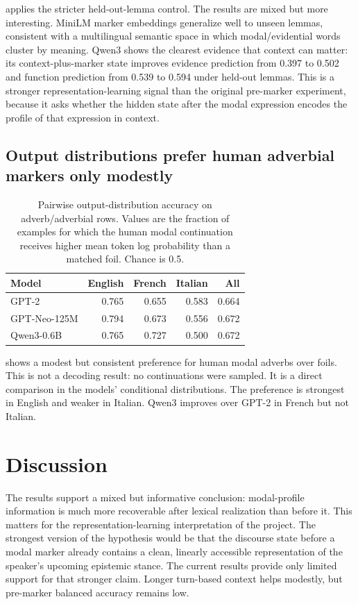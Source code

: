 \documentclass{article}
\begin{document}
 applies the stricter held-out-lemma control. The results are mixed but more interesting. MiniLM marker embeddings generalize well to unseen lemmas, consistent with a multilingual semantic space in which modal/evidential words cluster by meaning. Qwen3 shows the clearest evidence that context can matter: its context-plus-marker state improves evidence prediction from 0.397 to 0.502 and function prediction from 0.539 to 0.594 under held-out lemmas. This is a stronger representation-learning signal than the original pre-marker experiment, because it asks whether the hidden state after the modal expression encodes the profile of that expression in context.

\subsection{Output distributions prefer human adverbial markers only modestly}

\begin{table}[t]
\centering
\small
\begin{tabular}{lrrrr}
\toprule
Model & English & French & Italian & All \\
\midrule
GPT-2 & 0.765 & 0.655 & 0.583 & 0.664 \\
GPT-Neo-125M & 0.794 & 0.673 & 0.556 & 0.672 \\
Qwen3-0.6B & 0.765 & 0.727 & 0.500 & 0.672 \\
\bottomrule
\end{tabular}
\caption{Pairwise output-distribution accuracy on adverb/adverbial rows. Values are the fraction of examples for which the human modal continuation receives higher mean token log probability than a matched foil. Chance is 0.5.}
\label{tab:lm}
\end{table}

 shows a modest but consistent preference for human modal adverbs over foils. This is not a decoding result: no continuations were sampled. It is a direct comparison in the models' conditional distributions. The preference is strongest in English and weaker in Italian. Qwen3 improves over GPT-2 in French but not Italian.

\section{Discussion}

The results support a mixed but informative conclusion: modal-profile information is much more recoverable after lexical realization than before it. This matters for the representation-learning interpretation of the project. The strongest version of the hypothesis would be that the discourse state before a modal marker already contains a clean, linearly accessible representation of the speaker's upcoming epistemic stance. The current results provide only limited support for that stronger claim. Longer turn-based context helps modestly, but pre-marker balanced accuracy remains low.
\end{document}
